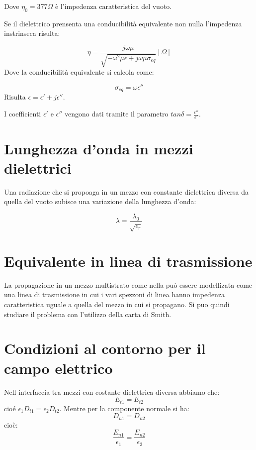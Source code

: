 \documentclass[10pt,a4paper]{report}
\begin{document}
		Dove $\eta_0=377\Omega$ è l'impedenza caratteristica del vuoto.

		Se il dielettrico prensenta una conducibilità equivalente non nulla l'impedenza instrinseca risulta:

		\begin{equation}
		\eta=\frac{j\omega\mu}{\sqrt{-\omega^2\mu\epsilon+j\omega\mu\sigma_{eq}}} [  \Omega  ]
		\end{equation}
		Dove la conducibilità equivalente si calcola come:

		\begin{equation}
		\sigma_{eq}=\omega \epsilon''
		\end{equation}
		Risulta $\epsilon=\epsilon'+j\epsilon''$.
		
		I coefficienti $\epsilon'$ e $\epsilon''$ vengono dati tramite il parametro $tan\delta=\frac{\epsilon''}{\epsilon'}$.

	\section{Lunghezza d'onda in mezzi dielettrici}
		Una radiazione che si propoaga in un mezzo con constante dielettrica diversa da quella del vuoto subisce una variazione della lunghezza d'onda:

		\begin{equation} 
		\lambda = \frac {\lambda_0} {\sqrt {\epsilon_r} }
		\end{equation} 

	\section{Equivalente in linea di trasmissione}

		
		La propagazione in un mezzo multistrato come nella può essere modellizata come una linea di trasmissione in cui i vari spezzoni di linea hanno impedenza caratteristica uguale a quella del mezzo in cui si propagano.	
		Si puo quindi studiare il problema con l'utilizzo della carta di Smith.

	\section{Condizioni al contorno per il campo elettrico}

		Nell interfaccia tra mezzi con costante dielettrica diversa abbiamo che:
		\begin{equation}
		E_{t1}=E_{t2} 
		\end{equation}
		cioé $\epsilon_1 D_{t1} = \epsilon_2 D_{t2}$.
		Mentre per la componente normale si ha:
		\begin{equation}
		D_{n1} = D_{n2}
		\end{equation}
		cioè:
		\[
		\frac{E_{n1}}{\epsilon_1}=\frac{E_{n2}}{\epsilon_2}
		\]
\end{document}
